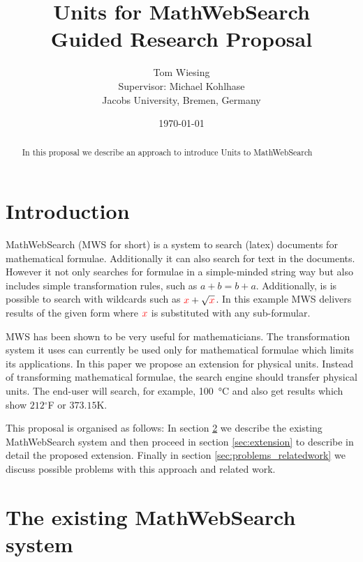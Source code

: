 \documentclass[11pt]{article}
\title{Units for MathWebSearch\ednote{Preliminary Title}\\ \vspace{2 mm} Guided Research Proposal}
\author{Tom Wiesing\\Supervisor: Michael Kohlhase\\Jacobs University, Bremen, Germany}
\date{\today}
\begin{document}
\maketitle

\begin{abstract}
  In this proposal we describe an approach to introduce Units to MathWebSearch
\end{abstract}

\section{Introduction}


MathWebSearch (MWS for short) is a system to search (latex) documents for mathematical formulae. Additionally it can also search for text in the documents. However it not only searches for formulae in a simple-minded string way but also includes simple transformation rules, such as $a + b = b + a$. Additionally, is is possible to search with wildcards such as $ { \color{red} x} + \sqrt{\color{red} x}$. In this example MWS delivers results of the given form where $\color{red} x$ is substituted with any sub-formular.

MWS has been shown to be very useful for mathematicians. The transformation system it uses can currently be used only for mathematical formulae which limits its applications. In this paper we propose an extension for physical units. Instead of transforming mathematical formulae, the search engine should transfer physical units.
The end-user will search, for example, \SI{100}{\degreeCelsius} and also get results which show $212$$^\circ$F or $373.15$K.

This proposal is organised as follows: In section \ref{sec:mws} we describe the existing MathWebSearch system and then proceed in section \ref{sec:extension} to describe in detail the proposed extension. Finally in section \ref{sec:problems_relatedwork} we discuss possible problems with this approach and related work.

\section{The existing MathWebSearch system}
\label{sec:mws}
\end{document}
